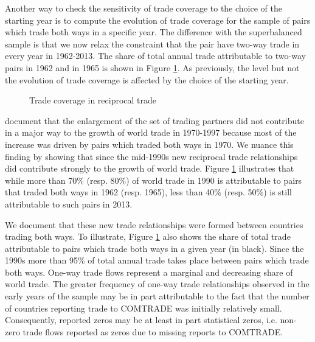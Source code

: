 \documentclass[12pt,twoside,a4paper,notitlepage]{article}
\begin{document}
Another way to check the sensitivity of trade coverage to the choice of the starting year is to compute the evolution of trade coverage for the sample of pairs which trade both ways in a specific year.
The difference with the superbalanced sample is that we now relax the constraint that the pair have two-way trade in every year in 1962-2013.
The share of total annual trade attributable to two-way pairs in 1962 and in 1965 is shown in Figure \ref{fig:reciprocal}.
As previously, the level but not the evolution of trade coverage is affected by the choice of the starting year.

\begin{figure}[h!]
\begin{center}
\setlength{\fboxrule}{1pt} %
\setlength{\fboxsep}{.1in} %
\end{center}
\caption{Trade coverage in reciprocal trade \label{fig:reciprocal}}
\end{figure}

\cite{Helpman2008} document that the enlargement of the set of trading partners did not contribute in a major way to the growth of world trade in 1970-1997 because most of the increase was driven by pairs which traded both ways in 1970.
We nuance this finding by showing that since the mid-1990s new reciprocal trade relationships did contribute strongly to the growth of world trade.
Figure \ref{fig:reciprocal} illustrates that while more than 70\% (resp.
80\%) of world trade in 1990 is attributable to pairs that traded both ways in 1962 (resp.
1965), less than 40\% (resp.
50\%) is still attributable to such pairs in 2013.
  

We document that these new trade relationships were formed between countries trading both ways.
To illustrate, Figure \ref{fig:reciprocal} also shows the share of total trade attributable to pairs which trade both ways in a given year (in black).
Since the 1990s more than 95\% of total annual trade takes place between pairs which trade both ways.
One-way trade flows represent a marginal and decreasing share of world trade.
The greater frequency of one-way trade relationships observed in the early years of the sample may be in part attributable to the fact that the number of countries reporting trade to COMTRADE was initially relatively small.
Consequently, reported zeros may be at least in part statistical zeros, i.e.
non-zero trade flows reported as zeros due to missing reports to COMTRADE.
\end{document}
